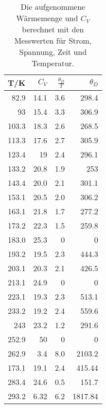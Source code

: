 \begin{table}[ht]
    \centering
    \caption{Die aufgenommene Wärmemenge und $C_V$ berechnet mit den Messwerten für Strom, Spannung, Zeit und Temperatur.}
    \begin{tabular}{rrrr}
    \toprule
    T/K & $C_V$ & $\frac{\theta_D}{T}$ & $\theta_D$  \\ 
    \midrule
    82.9 & 14.1& 3.6& 298.4 \\ 
    93   & 15.4& 3.3& 306.9 \\
    103.3& 18.3& 2.6& 268.5 \\
    113.3& 17.6& 2.7& 305.9 \\
    123.4& 19  & 2.4& 296.1 \\
    133.2& 20.8& 1.9& 253   \\
    143.4& 20.0& 2.1& 301.1 \\
    153.1& 20.5& 2.0& 306.2 \\
    163.1& 21.8& 1.7& 277.2 \\
    173.2& 22.3& 1.5& 259.8 \\
    183.0& 25.3& 0  & 0     \\ 
    193.2& 19.5& 2.3& 444.3 \\
    203.1& 20.3& 2.1& 426.5 \\
    213.1& 24.9& 0  & 0     \\ 
    223.1& 19.3& 2.3& 513.1 \\
    233.2& 19.2& 2.4& 559.6 \\
    243  & 23.2& 1.2& 291.6 \\
    252.9& 50  & 0  & 0     \\ 
    262.9& 3.4 & 8.0& 2103.2 \\
    173.1& 19.1& 2.4& 415.44 \\
    283.4& 24.6& 0.5& 151.7 \\
    293.2& 6.32& 6.2& 1817.84 \\
    \bottomrule
    \end{tabular}
    \label{tab:debey2}
\end{table}